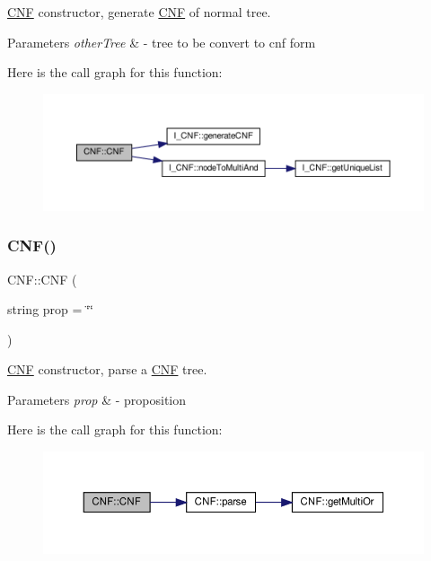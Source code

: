 \hyperlink{class_c_n_f}{C\+NF} constructor, generate \hyperlink{class_c_n_f}{C\+NF} of normal tree. 


\begin{DoxyParams}{Parameters}
{\em other\+Tree} & -\/ tree to be convert to cnf form \\
\hline
\end{DoxyParams}
Here is the call graph for this function\+:\nopagebreak
\begin{figure}[H]
\begin{center}
\leavevmode
\includegraphics[width=350pt]{dc/d0e/class_c_n_f_af775e3be36e475027355d21e9ba43166_cgraph}
\end{center}
\end{figure}
\mbox{\label{class_c_n_f_acb13869409764d8abbea2e50910fd7bc}} 
\subsubsection{\texorpdfstring{C\+N\+F()}{CNF()}\hspace{0.1cm}{\footnotesize\ttfamily [2/2]}}
{\footnotesize\ttfamily C\+N\+F\+::\+C\+NF (\begin{DoxyParamCaption}\item[{string}]{prop = {\ttfamily \char`\"{}\char`\"{}} }\end{DoxyParamCaption})}



\hyperlink{class_c_n_f}{C\+NF} constructor, parse a \hyperlink{class_c_n_f}{C\+NF} tree. 


\begin{DoxyParams}{Parameters}
{\em prop} & -\/ proposition \\
\hline
\end{DoxyParams}
Here is the call graph for this function\+:\nopagebreak
\begin{figure}[H]
\begin{center}
\leavevmode
\includegraphics[width=350pt]{dc/d0e/class_c_n_f_acb13869409764d8abbea2e50910fd7bc_cgraph}
\end{center}
\end{figure}
\mbox{\label{class_c_n_f_a7bce39709f41a431d486f988b32646de}} 
